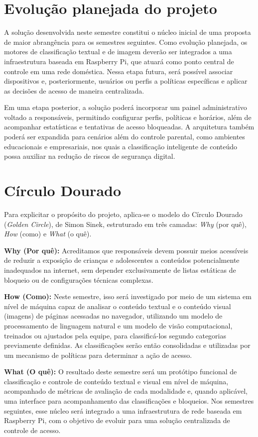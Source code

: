 \documentclass[
    12pt,           %
    oneside,        %
    a4paper,        %
    chapter=TITLE,  %
    english,        %
    brazil          %
]{abntex2}
\begin{document}
\section*{Evolução planejada do projeto}

A solução desenvolvida neste semestre constitui o núcleo inicial de uma
proposta de maior abrangência para os semestres seguintes. Como evolução
planejada, os motores de classificação textual e de imagem deverão ser
integrados a uma infraestrutura baseada em Raspberry Pi, que atuará como
ponto central de controle em uma rede doméstica. Nessa etapa futura, será
possível associar dispositivos e,
posteriormente, usuários ou perfis a políticas específicas e aplicar as
decisões de acesso de maneira centralizada.

Em uma etapa posterior, a solução poderá incorporar um painel administrativo
voltado a responsáveis, permitindo configurar perfis, políticas e horários,
além de acompanhar estatísticas e tentativas de acesso bloqueadas. A
arquitetura também poderá ser expandida para cenários além do controle
parental, como ambientes educacionais e empresariais, nos quais a classificação
inteligente de conteúdo possa auxiliar na redução de riscos de segurança
digital.

\section*{Círculo Dourado}

Para explicitar o propósito do projeto, aplica-se o modelo do Círculo Dourado
(\textit{Golden Circle}), de Simon Sinek, estruturado em três camadas:
\textit{Why} (por quê), \textit{How} (como) e \textit{What} (o quê).

\begin{alineas}
    \item \textbf{Why (Por quê):} Acreditamos que responsáveis devem possuir meios acessíveis de reduzir a exposição de crianças e adolescentes a conteúdos potencialmente inadequados na internet, sem depender exclusivamente de listas estáticas de bloqueio ou de configurações técnicas complexas.
    \item \textbf{How (Como):} Neste semestre, isso será investigado por meio de um sistema em nível de máquina capaz de analisar o conteúdo textual e o conteúdo visual (imagens) de páginas acessadas no navegador, utilizando um modelo de processamento de linguagem natural e um modelo de visão computacional, treinados ou ajustados pela equipe, para classificá-los segundo categorias previamente definidas. As classificações serão então consolidadas e utilizadas por um mecanismo de políticas para determinar a ação de acesso.
    \item \textbf{What (O quê):} O resultado deste semestre será um protótipo funcional de classificação e controle de conteúdo textual e visual em nível de máquina, acompanhado de métricas de avaliação de cada modalidade e, quando aplicável, uma interface para acompanhamento das classificações e bloqueios. Nos semestres seguintes, esse núcleo será integrado a uma infraestrutura de rede baseada em Raspberry Pi, com o objetivo de evoluir para uma solução centralizada de controle de acesso.
\end{alineas}
\end{document}
